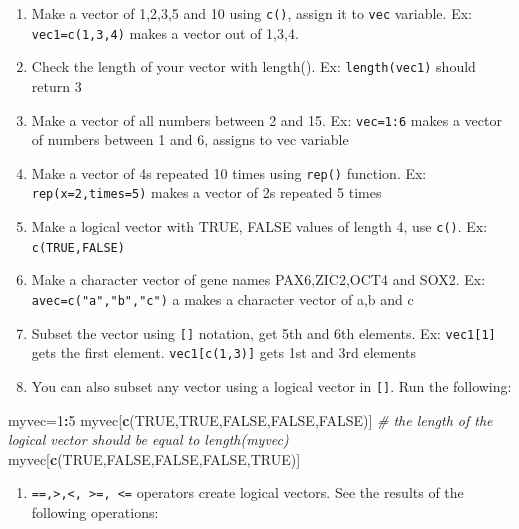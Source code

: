 \documentclass[12pt,]{krantz}
\newenvironment{Shaded}{\begin{snugshade}}{\end{snugshade}}
\newcommand{\CommentTok}[1]{\textcolor[rgb]{0.56,0.35,0.01}{\textit{#1}}}
\newcommand{\DecValTok}[1]{\textcolor[rgb]{0.00,0.00,0.81}{#1}}
\newcommand{\KeywordTok}[1]{\textcolor[rgb]{0.13,0.29,0.53}{\textbf{#1}}}
\newcommand{\NormalTok}[1]{#1}
\newcommand{\OperatorTok}[1]{\textcolor[rgb]{0.81,0.36,0.00}{\textbf{#1}}}
\newcommand{\OtherTok}[1]{\textcolor[rgb]{0.56,0.35,0.01}{#1}}
\providecommand{\tightlist}{%
  \setlength{\itemsep}{0pt}\setlength{\parskip}{0pt}}
\theoremstyle{definition}
\theoremstyle{definition}
\theoremstyle{definition}
\theoremstyle{remark}
\begin{document}
\begin{enumerate}
\def\labelenumi{\arabic{enumi}.}
\setcounter{enumi}{9}
\item
  Make a vector of 1,2,3,5 and 10 using \texttt{c()}, assign it to
  \texttt{vec} variable. Ex: \texttt{vec1=c(1,3,4)} makes a vector out
  of 1,3,4.
\item
  Check the length of your vector with length(). Ex:
  \texttt{length(vec1)} should return 3
\item
  Make a vector of all numbers between 2 and 15. Ex: \texttt{vec=1:6}
  makes a vector of numbers between 1 and 6, assigns to vec variable
\item
  Make a vector of 4s repeated 10 times using \texttt{rep()} function.
  Ex: \texttt{rep(x=2,times=5)} makes a vector of 2s repeated 5 times
\item
  Make a logical vector with TRUE, FALSE values of length 4, use
  \texttt{c()}. Ex: \texttt{c(TRUE,FALSE)}
\item
  Make a character vector of gene names PAX6,ZIC2,OCT4 and SOX2. Ex:
  \texttt{avec=c("a","b","c")} a makes a character vector of a,b and c
\item
  Subset the vector using \texttt{{[}{]}} notation, get 5th and 6th
  elements. Ex: \texttt{vec1{[}1{]}} gets the first element.
  \texttt{vec1{[}c(1,3){]}} gets 1st and 3rd elements
\item
  You can also subset any vector using a logical vector in
  \texttt{{[}{]}}. Run the following:
\end{enumerate}

\begin{Shaded}
\begin{Highlighting}[]
\NormalTok{myvec=}\DecValTok{1}\OperatorTok{:}\DecValTok{5}
\NormalTok{myvec[}\KeywordTok{c}\NormalTok{(}\OtherTok{TRUE}\NormalTok{,}\OtherTok{TRUE}\NormalTok{,}\OtherTok{FALSE}\NormalTok{,}\OtherTok{FALSE}\NormalTok{,}\OtherTok{FALSE}\NormalTok{)] }\CommentTok{# the length of the logical vector should be equal to length(myvec) }
\NormalTok{myvec[}\KeywordTok{c}\NormalTok{(}\OtherTok{TRUE}\NormalTok{,}\OtherTok{FALSE}\NormalTok{,}\OtherTok{FALSE}\NormalTok{,}\OtherTok{FALSE}\NormalTok{,}\OtherTok{TRUE}\NormalTok{)]}
\end{Highlighting}
\end{Shaded}

\begin{enumerate}
\def\labelenumi{\arabic{enumi}.}
\setcounter{enumi}{17}
\tightlist
\item
  \texttt{==,\textgreater{},\textless{},\ \textgreater{}=,\ \textless{}=}
  operators create logical vectors. See the results of the following
  operations:
\end{enumerate}
\end{document}
